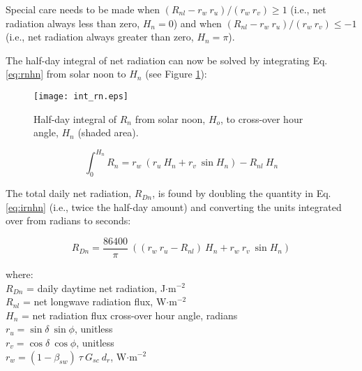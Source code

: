 \noindent Special care needs to be made when $(R_{nl}-r_w\: r_u)/(r_w\: r_v) \geq 1$ (i.e., net radiation always less than zero, $H_n = 0$) and when $(R_{nl}-r_w\: r_u)/(r_w\: r_v) \leq -1$ (i.e., net radiation always greater than zero, $H_n = \pi$). 

The half-day integral of net radiation can now be solved by integrating Eq. \ref{eq:rnhn} from solar noon to $H_n$ (see Figure \ref{fig:intrn}):

\begin{figure}[ht!]
    \texttt{[image: int\_rn.eps]}
    \caption{Half-day integral of $R_n$ from solar noon, $H_o$, to cross-over hour angle, $H_n$ (shaded area).}
    \label{fig:intrn}
\end{figure}

\begin{equation}
\label{eq:irnhn}
	\int_0^{H_n} R_{n} = r_w\: \left(r_u\: H_n + r_v\: \sin H_n \right) - 
	R_{nl}\: H_n
\end{equation}

\noindent The total daily net radiation, $R_{Dn}$, is found by doubling the quantity in Eq. \ref{eq:irnhn} (i.e., twice the half-day amount) and converting the units integrated over from radians to seconds:

\begin{equation}
\label{eq:dayrn}
	R_{Dn} = \frac{86400}{\pi}\: \left( 
	             \left( r_w\: r_u - R_{nl}\right)\: H_n + 
	             r_w\: r_v\: \sin H_n
	         \right)
\end{equation}

\noindent where: \\
\indent $R_{Dn}$ = daily daytime net radiation, J$\cdot$m$^{-2}$ \\
\indent $R_{nl}$ = net longwave radiation flux, W$\cdot$m$^{-2}$\\
\indent $H_n$ = net radiation flux cross-over hour angle, radians\\
\indent $r_u = \sin\delta\: \sin\phi$, unitless \\
\indent $r_v = \cos\delta\: \cos\phi$, unitless \\
\indent $r_w = \left(1-\beta_{sw}\right)\:\tau\: G_{sc}\: d_r$, W$\cdot$m$^{-2}$\\

